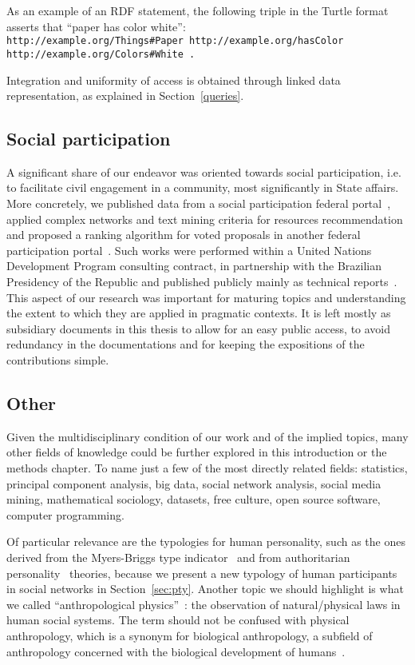 As an example of an RDF statement, the following triple in the Turtle
format asserts that ``paper has color white'':\\
\texttt{http://example.org/Things\#Paper http://example.org/hasColor\\
http://example.org/Colors\#White .}

Integration and uniformity of access is obtained through linked data
representation, as explained in Section~\ref{queries}.

\subsection{Social participation}
A significant share of our endeavor was oriented towards social participation,
i.e. to facilitate civil engagement in a community, most significantly in State affairs.
More concretely, we published data from a social participation federal portal~\cite{losd},
applied complex networks and text mining criteria for resources recommendation~\cite{pnud3,pnud4,opa} and
proposed a ranking algorithm for voted proposals in another federal participation portal~\cite{dialogaAlg}.
Such works were performed within a United Nations Development Program consulting contract,
in partnership with the Brazilian Presidency of the Republic and published publicly mainly as technical reports~\cite{pnud3,pnud4,opa}.
This aspect of our research was important for maturing topics and understanding
the extent to which they are applied in pragmatic contexts.
It is left mostly as subsidiary documents in this thesis to allow for an easy public access,
to avoid redundancy in the documentations and for keeping the expositions of the contributions simple.

\subsection{Other}
Given the multidisciplinary condition of our work and of the implied topics,
many other fields of knowledge could be further explored in this introduction or
the methods chapter.
To name just a few of the most directly related fields: statistics, principal component analysis,
big data, social network analysis, social media mining, mathematical sociology,
datasets, free culture, open source software, computer programming.

Of particular relevance are the typologies for human personality, such as the ones derived
from the Myers-Briggs type indicator~\cite{mb} and from authoritarian personality~\cite{adorno} theories,
because we present a new typology of human participants in social networks in Section~\ref{sec:pty}.
Another topic we should highlight is what we called ``anthropological physics''~\cite{anPhy,ccs15}:
the observation of natural/physical laws in human social systems.
The term should not be confused with physical anthropology, which is a synonym for biological anthropology,
a subfield of anthropology concerned with the biological development of humans~\cite{phyAn}.

